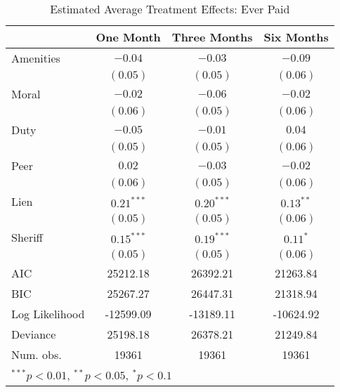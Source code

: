 \documentclass[12pt,titlepage]{article}
\begin{document}
\begin{table}[htbp]
\caption{Estimated Average Treatment Effects: Ever Paid}
\begin{center}
\begin{tabular}{l c c c }
\hline
               & One Month & Three Months & Six Months \\
\hline
Amenities      & $-0.04$      & $-0.03$      & $-0.09$     \\
               & $(0.05)$     & $(0.05)$     & $(0.06)$    \\
Moral          & $-0.02$      & $-0.06$      & $-0.02$     \\
               & $(0.06)$     & $(0.05)$     & $(0.06)$    \\
Duty           & $-0.05$      & $-0.01$      & $0.04$      \\
               & $(0.05)$     & $(0.05)$     & $(0.06)$    \\
Peer           & $0.02$       & $-0.03$      & $-0.02$     \\
               & $(0.06)$     & $(0.05)$     & $(0.06)$    \\
Lien           & $0.21^{***}$ & $0.20^{***}$ & $0.13^{**}$ \\
               & $(0.05)$     & $(0.05)$     & $(0.06)$    \\
Sheriff        & $0.15^{***}$ & $0.19^{***}$ & $0.11^{*}$  \\
               & $(0.05)$     & $(0.05)$     & $(0.06)$    \\
\hline
AIC            & 25212.18     & 26392.21     & 21263.84    \\
BIC            & 25267.27     & 26447.31     & 21318.94    \\
Log Likelihood & -12599.09    & -13189.11    & -10624.92   \\
Deviance       & 25198.18     & 26378.21     & 21249.84    \\
Num. obs.      & 19361        & 19361        & 19361       \\
\hline
\multicolumn{4}{l}{\scriptsize{$^{***}p<0.01$, $^{**}p<0.05$, $^*p<0.1$}}
\end{tabular}
\label{tbl:reg7_ep}
\end{center}
\end{table}
\end{document}
